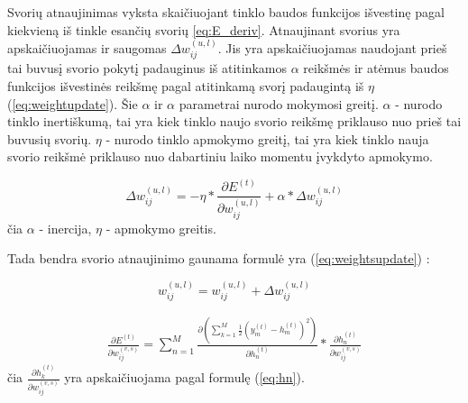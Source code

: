  Svorių atnaujinimas vyksta skaičiuojant tinklo baudos funkcijos išvestinę pagal kiekvieną iš tinkle esančių svorių \ref{eq:E_deriv}. Atnaujinant svorius yra apskaičiuojamas ir saugomas \begin{math}\Delta w_{ij}^{(u,l)}\end{math}. Jis yra apskaičiuojamas naudojant prieš tai buvusį svorio pokytį padauginus iš atitinkamos \begin{math}\alpha\end{math} reikšmės ir atėmus baudos funkcijos išvestinės reikšmę pagal atitinkamą svorį padaugintą iš \begin{math}\eta\end{math} (\ref{eq:weightupdate}). Šie \begin{math}\alpha \end{math} ir \begin{math}\alpha\end{math} parametrai nurodo mokymosi greitį. \begin{math}\alpha\end{math} - nurodo tinklo inertiškumą, tai yra kiek tinklo naujo svorio reikšmę priklauso nuo prieš tai buvusių svorių. \begin{math}\eta\end{math} - nurodo tinklo apmokymo greitį, tai yra kiek tinklo nauja svorio reikšmė priklauso nuo dabartiniu laiko momentu įvykdyto apmokymo.


\begin{equation}\label{eq:weightupdate}
  \Delta w_{ij}^{(u,l)} = -\eta*\frac{\partial E^{(t)}}{\partial w_{ij}^{(u,l)}} + \alpha*\Delta w_{ij}^{(u,l)}
\end{equation}
čia \begin{math}\alpha\end{math} - inercija, \begin{math}\eta\end{math} - apmokymo greitis.

Tada bendra svorio atnaujinimo gaunama formulė yra (\ref{eq:weightsupdate}) :

\begin{equation}\label{eq:weightsupdate}
  w_{ij}^{(u,l)} = w_{ij}^{(u,l)} + \Delta w_{ij}^{(u,l)}
\end{equation}

\begin{equation} \label{eq:E_deriv}
  \begin{aligned}
  \frac{\partial E^{(t)}}{\partial w_{ij}^{(v,s)}} = \sum_{n=1}^{M} \frac{\partial (\sum_{k=1}^{M} \frac{1}{2}(y_m^{(t)} - h_m^{(t)})^{2})}{\partial h_n^{(t)}} * \frac{\partial h_n^{(t)}}{\partial w_{ij}^{(v,s)}}
  \end{aligned}
\end{equation}
čia \begin{math}\frac{\partial h_k^{(t)}}{\partial w_{ij}^{(v,s)}}\end{math} yra apskaičiuojama pagal formulę (\ref{eq:hn}).


